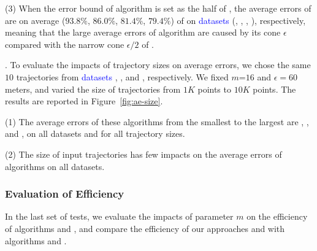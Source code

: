 \ni(3) When the error bound of algorithm \cista is set as the half of \cist, the average errors of \cista are on average ($93.8\%$, $86.0\%$, $81.4\%$, {$79.4\%$}) of \cist on \textcolor{blue}{datasets} (\truck, \sercar, \geolife, \pricar), respectively, meaning that the large average errors of algorithm \cista are caused by its cone \wrt $\epsilon$ compared with the narrow cone \wrt $\epsilon/2$ of \cist.


.
To evaluate the impacts of trajectory sizes on average errors, we chose the same {$10$} trajectories from \textcolor{blue}{datasets} \truck, \sercar, \geolife and \pricar, respectively.
We fixed {$m$=$16$} and $\epsilon = 60$ meters, and varied the size  of trajectories from $1K$ points to $10K$ points.
%
The results are reported in Figure~\ref{fig:ae-size}.

\ni(1) The average errors of these algorithms from the smallest to the largest are \squishe, \dps, \cist and \cista, on all datasets and for all trajectory sizes. %

\ni(2) The size of input trajectories has few impacts on the average errors of \lsa algorithms on all datasets.




\subsubsection{Evaluation of Efficiency}


In the last set of tests, we evaluate the impacts of parameter $m$ on the efficiency of algorithms \cist and \cista, and compare the efficiency of our approaches \cist and \cista with algorithms \dps and \squishe.
%


